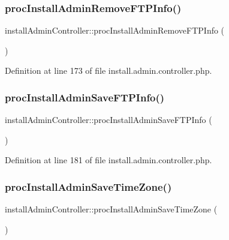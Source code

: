 \subsubsection{\texorpdfstring{proc\+Install\+Admin\+Remove\+F\+T\+P\+Info()}{procInstallAdminRemoveFTPInfo()}}
{\footnotesize\ttfamily install\+Admin\+Controller\+::proc\+Install\+Admin\+Remove\+F\+T\+P\+Info (\begin{DoxyParamCaption}{ }\end{DoxyParamCaption})}



Definition at line 173 of file install.\+admin.\+controller.\+php.

\hypertarget{classinstallAdminController_a3ea9e37eed169cfa5448359db173f263}{}\label{classinstallAdminController_a3ea9e37eed169cfa5448359db173f263} 
\subsubsection{\texorpdfstring{proc\+Install\+Admin\+Save\+F\+T\+P\+Info()}{procInstallAdminSaveFTPInfo()}}
{\footnotesize\ttfamily install\+Admin\+Controller\+::proc\+Install\+Admin\+Save\+F\+T\+P\+Info (\begin{DoxyParamCaption}{ }\end{DoxyParamCaption})}



Definition at line 181 of file install.\+admin.\+controller.\+php.

\hypertarget{classinstallAdminController_a0b7b97dd361bda6202fb1c8895852960}{}\label{classinstallAdminController_a0b7b97dd361bda6202fb1c8895852960} 
\subsubsection{\texorpdfstring{proc\+Install\+Admin\+Save\+Time\+Zone()}{procInstallAdminSaveTimeZone()}}
{\footnotesize\ttfamily install\+Admin\+Controller\+::proc\+Install\+Admin\+Save\+Time\+Zone (\begin{DoxyParamCaption}{ }\end{DoxyParamCaption})}



